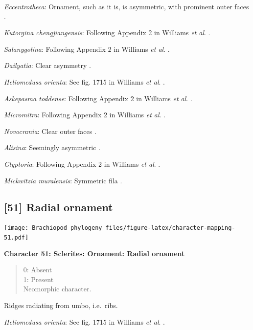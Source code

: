 \documentclass[]{book}
\theoremstyle{definition}
\theoremstyle{definition}
\theoremstyle{definition}
\theoremstyle{remark}
\begin{document}
\emph{Eccentrotheca}: Ornament, such as it is, is asymmetric, with
prominent outer faces \citep{Skovsted2011Scleritomeconstruction}.

\emph{Kutorgina chengjiangensis}: Following Appendix 2 in Williams
\emph{et al}. \citeyearpar{Williams1998Thediversity}.

\emph{Salanygolina}: Following Appendix 2 in Williams \emph{et al}.
\citeyearpar{Williams1998Thediversity}.

\emph{Dailyatia}: Clear asymmetry \citep{Skovsted2015Theearly}.

\emph{Heliomedusa orienta}: See fig. 1715 in Williams \emph{et al}.
\citeyearpar{Williams2007PartH}.

\emph{Askepasma toddense}: Following Appendix 2 in Williams \emph{et
al}. \citeyearpar{Williams1998Thediversity}.

\emph{Micromitra}: Following Appendix 2 in Williams \emph{et al}.
\citeyearpar{Williams1998Thediversity}.

\emph{Novocrania}: Clear outer faces \citep[fig.
100.2b]{Williams2000BrachiopodaLinguliformea}.

\emph{Alisina}: Seemingly asymmetric \citetext{\citealp[fig.
122.3c]{Williams2000BrachiopodaLinguliformea}; \citealp[Fig.
1]{Zhang2011Anobolellate}}.

\emph{Glyptoria}: Following Appendix 2 in Williams \emph{et al}.
\citeyearpar{Williams1998Thediversity}.

\emph{Mickwitzia muralensis}: Symmetric fila
\citep{Balthasar2004Shellstructure}.

\hypertarget{radial-ornament}{%
\subsection*{{[}51{]} Radial ornament}\label{radial-ornament}}

\texttt{[image: Brachiopod\_phylogeny\_files/figure-latex/character-mapping-51.pdf]}

\textbf{Character 51: Sclerites: Ornament: Radial ornament}

\begin{quote}
0: Absent\\
1: Present\\
Neomorphic character.
\end{quote}

Ridges radiating from umbo, i.e.~ribs.

\emph{Heliomedusa orienta}: See fig. 1715 in Williams \emph{et al}.
\citeyearpar{Williams2007PartH}.
\end{document}

